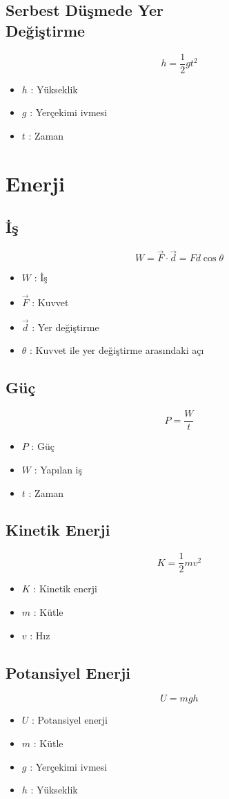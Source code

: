 \documentclass[a4paper, 11pt, titlepage]{article}
\begin{document}
\subsection[Serbest Düşmede Yer Değiştirme]{Serbest Düşmede Yer \\Değiştirme}
\[
h = \frac{1}{2} g t^2
\]
\begin{itemize}
  \item $h$ : Yükseklik
  \item $g$ : Yerçekimi ivmesi
  \item $t$ : Zaman
\end{itemize}

\section{Enerji}
\subsection{İş}
\[
W = \vec{F} \cdot \vec{d} = F d \cos \theta
\]
\begin{itemize}
  \item $W$ : İş
  \item $\vec{F}$ : Kuvvet
  \item $\vec{d}$ : Yer değiştirme
  \item $\theta$ : Kuvvet ile yer değiştirme arasındaki açı
\end{itemize}

\subsection{Güç}
\[
P = \frac{W}{t}
\]
\begin{itemize}
  \item $P$ : Güç
  \item $W$ : Yapılan iş
  \item $t$ : Zaman
\end{itemize}

\subsection{Kinetik Enerji}
\[
K = \frac{1}{2} m v^2
\]
\begin{itemize}
  \item $K$ : Kinetik enerji
  \item $m$ : Kütle
  \item $v$ : Hız
\end{itemize}

\subsection{Potansiyel Enerji}
\[
U = m g h
\]
\begin{itemize}
  \item $U$ : Potansiyel enerji
  \item $m$ : Kütle
  \item $g$ : Yerçekimi ivmesi
  \item $h$ : Yükseklik
\end{itemize}
\end{document}
